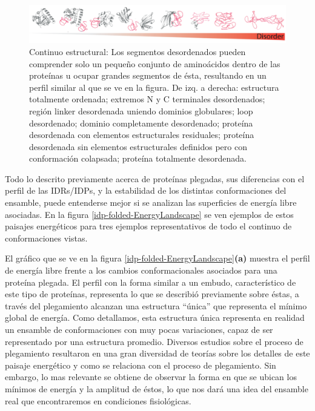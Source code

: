 \begin{figure}[htbp]
\centering
\includegraphics[width=1.0\textwidth]{img/conformationContinuum.png} 
\caption{ Continuo estructural: Los segmentos desordenados pueden comprender solo un pequeño conjunto de aminoácidos dentro de las proteínas u ocupar grandes segmentos de ésta, resultando en un
perfil similar al que se ve en la figura. De izq. a derecha: estructura totalmente ordenada; extremos N y C terminales desordenados; región linker desordenada uniendo dominios globulares; loop desordenado;
dominio completamente desordenado; proteína desordenada con elementos estructurales residuales; proteína desordenada sin elementos estructurales definidos pero con conformación colapsada; proteína totalmente desordenada.
}
\label{conformationContinuum}
\end{figure}





Todo lo descrito previamente acerca de proteínas plegadas, sus diferencias con el perfil de las IDRs/IDPs, y la estabilidad de los distintas conformaciones del ensamble, 
puede entenderse mejor si se analizan las superficies de energía libre asociadas. 
En la figura \ref{idp-folded-EnergyLandscape} se ven ejemplos de estos paisajes energéticos para tres ejemplos representativos de todo el continuo de conformaciones vistas.

El gráfico que se ve en la figura \ref{idp-folded-EnergyLandscape}\textbf{(a)} muestra el perfil de energía libre frente a los cambios conformacionales asociados para una proteína plegada.
El perfil con la forma similar a un embudo, característico de este tipo de proteínas, representa lo que se describió previamente sobre éstas, a través del plegamiento alcanzan una estructura ``única'' que 
representa el mínimo global de energía. 
Como detallamos, esta estructura única representa en realidad un ensamble de conformaciones con muy pocas variaciones, capaz de ser representado por una estructura promedio.
Diversos estudios sobre el proceso de plegamiento resultaron en una gran diversidad de teorías sobre los detalles de este paisaje energético y como se relaciona con el proceso de plegamiento.
Sin embargo, lo mas relevante se obtiene de observar la forma en que se ubican los mínimos de energía y la amplitud de éstos, lo que nos dará una idea del ensamble real que encontraremos en condiciones fisiológicas.

